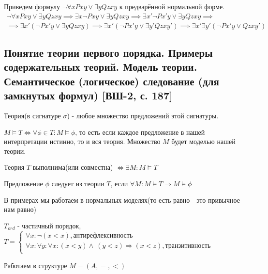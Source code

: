 \documentclass[a4paper, fleqn]{article}
\begin{document}
    \begin{example}
        Приведем формулу $\neg \forall x Pxy \vee \exists y Qzxy$ к предварённой нормальной форме.
        \begin{gather*}
            \neg \forall x Pxy \vee \exists y Qzxy \implies \exists x \neg Pxy \vee \exists y Qzxy \implies \exists x' \neg Px'y \vee \exists y Qzxy \implies \\ \implies \exists x' (\neg Px'y \vee \exists y Qzxy) \implies \exists x' (\neg Px'y \vee \exists y' Qzxy') \implies \exists x' \exists y' (\neg Px'y \vee Qzxy')
        \end{gather*}
    \end{example}

    \subsection{Понятие теории первого порядка. Примеры содержательных теорий. Модель теории. Семантическое (логическое) следование (для замкнутых формул) [ВШ-2, с. 187]}
        \begin{definition}
            Теория(в сигнатуре $\sigma$) - любое множество предложений этой 
            сигнатуры. 
        \end{definition}
        \begin{definition}
            $M \vDash T \iff \forall \phi \in T : M \vDash \phi$, то есть 
            если каждое предложение в нашей интерпретации истинно, то 
            и вся теория. Множество $M$ будет моделью нашей теории.
        \end{definition}
        \begin{definition}
            Теория $T$ выполнима(или совместна) $\iff \exists
            M :  M \vDash T$
        \end{definition}
        \begin{definition}
            Предложение $\phi$ следует из теории $T$, если $\forall 
            M : M \vDash T \Rightarrow M \vDash \phi$
        \end{definition}
        В примерах мы работаем в нормальных моделях(то есть равно - это привычное нам равно)
        \begin{example}
            $T_{ord}$ - частичный порядок,
            $T = 
            \begin{cases}
                \forall x : \neg (x < x), \text{антирефлексивность} \\
                \forall x : \forall y : \forall x : (x < y) \wedge\ (y < z) \Rightarrow (x < z), \text{транзитивность} \\
            \end{cases}$

            Работаем в структуре $M = (A, =, <)$       
        \end{example}
\end{document}
